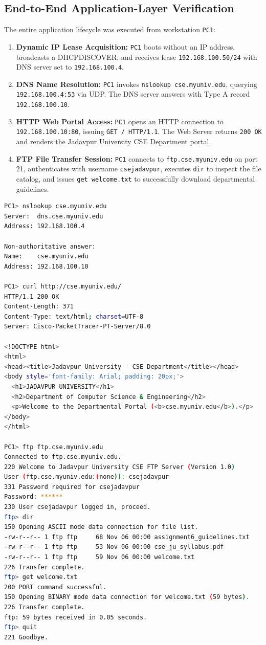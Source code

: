 \documentclass[12pt, a4paper]{article}
\begin{document}
\subsection{End-to-End Application-Layer Verification}
The entire application lifecycle was executed from workstation \texttt{PC1}:
\begin{enumerate}
    \item \textbf{Dynamic IP Lease Acquisition:} \texttt{PC1} boots without an IP address, broadcasts a DHCPDISCOVER, and receives lease \texttt{192.168.100.50/24} with DNS server set to \texttt{192.168.100.4}.
    \item \textbf{DNS Name Resolution:} \texttt{PC1} invokes \texttt{nslookup cse.myuniv.edu}, querying \texttt{192.168.100.4:53} via UDP. The DNS server answers with Type A record \texttt{192.168.100.10}.
    \item \textbf{HTTP Web Portal Access:} \texttt{PC1} opens an HTTP connection to \texttt{192.168.100.10:80}, issuing \texttt{GET / HTTP/1.1}. The Web Server returns \texttt{200 OK} and renders the Jadavpur University CSE Department portal.
    \item \textbf{FTP File Transfer Session:} \texttt{PC1} connects to \texttt{ftp.cse.myuniv.edu} on port 21, authenticates with username \texttt{csejadavpur}, executes \texttt{dir} to inspect the file catalog, and issues \texttt{get welcome.txt} to successfully download departmental guidelines.
\end{enumerate}

\begin{lstlisting}[language=bash, caption={Application Session Output: nslookup, HTTP GET, and FTP File Retrieval}]
PC1> nslookup cse.myuniv.edu
Server:  dns.cse.myuniv.edu
Address: 192.168.100.4

Non-authoritative answer:
Name:    cse.myuniv.edu
Address: 192.168.100.10

PC1> curl http://cse.myuniv.edu/
HTTP/1.1 200 OK
Content-Length: 371
Content-Type: text/html; charset=UTF-8
Server: Cisco-PacketTracer-PT-Server/8.0

<!DOCTYPE html>
<html>
<head><title>Jadavpur University - CSE Department</title></head>
<body style='font-family: Arial; padding: 20px;'>
  <h1>JADAVPUR UNIVERSITY</h1>
  <h2>Department of Computer Science & Engineering</h2>
  <p>Welcome to the Departmental Portal (<b>cse.myuniv.edu</b>).</p>
</body>
</html>

PC1> ftp ftp.cse.myuniv.edu
Connected to ftp.cse.myuniv.edu.
220 Welcome to Jadavpur University CSE FTP Server (Version 1.0)
User (ftp.cse.myuniv.edu:(none)): csejadavpur
331 Password required for csejadavpur
Password: ******
230 User csejadavpur logged in, proceed.
ftp> dir
150 Opening ASCII mode data connection for file list.
-rw-r--r-- 1 ftp ftp     68 Nov 06 00:00 assignment6_guidelines.txt
-rw-r--r-- 1 ftp ftp     53 Nov 06 00:00 cse_ju_syllabus.pdf
-rw-r--r-- 1 ftp ftp     59 Nov 06 00:00 welcome.txt
226 Transfer complete.
ftp> get welcome.txt
200 PORT command successful.
150 Opening BINARY mode data connection for welcome.txt (59 bytes).
226 Transfer complete.
ftp: 59 bytes received in 0.05 seconds.
ftp> quit
221 Goodbye.
\end{lstlisting}
\end{document}
